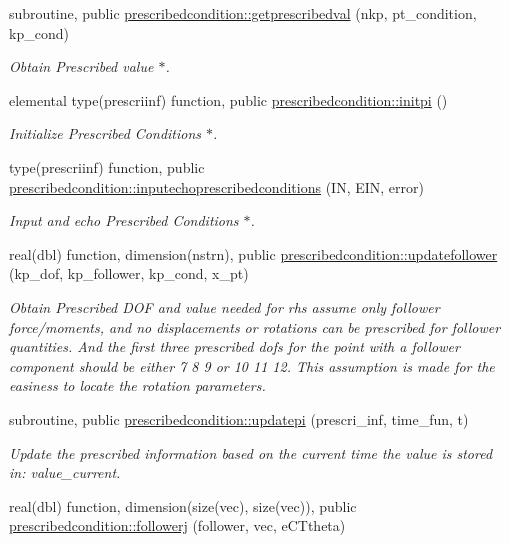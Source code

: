 \begin{DoxyCompactItemize}
subroutine, public \hyperlink{namespaceprescribedcondition_aca74e9a71af6abd13879e147076e89ef}{prescribedcondition\+::getprescribedval} (nkp, pt\+\_\+condition, kp\+\_\+cond)
\begin{DoxyCompactList}\small\item\em Obtain Prescribed value $\ast$. \end{DoxyCompactList}\item 
elemental type(prescriinf) function, public \hyperlink{namespaceprescribedcondition_ae3bccf07eaf4452047a11ce8dcb3e554}{prescribedcondition\+::initpi} ()
\begin{DoxyCompactList}\small\item\em Initialize Prescribed Conditions $\ast$. \end{DoxyCompactList}\item 
type(prescriinf) function, public \hyperlink{namespaceprescribedcondition_a66d378b405e124a0d9a7ad04e262109b}{prescribedcondition\+::inputechoprescribedconditions} (IN, E\+IN, error)
\begin{DoxyCompactList}\small\item\em Input and echo Prescribed Conditions $\ast$. \end{DoxyCompactList}\item 
real(dbl) function, dimension(nstrn), public \hyperlink{namespaceprescribedcondition_a58a4332d8bb0ceb882aa3229085dce34}{prescribedcondition\+::updatefollower} (kp\+\_\+dof, kp\+\_\+follower, kp\+\_\+cond, x\+\_\+pt)
\begin{DoxyCompactList}\small\item\em Obtain Prescribed D\+OF and value needed for rhs assume only follower force/moments, and no displacements or rotations can be prescribed for follower quantities. And the first three prescribed dofs for the point with a follower component should be either 7 8 9 or 10 11 12. This assumption is made for the easiness to locate the rotation parameters. \end{DoxyCompactList}\item 
subroutine, public \hyperlink{namespaceprescribedcondition_a270714d4f42553a8f966674392dedbfe}{prescribedcondition\+::updatepi} (prescri\+\_\+inf, time\+\_\+fun, t)
\begin{DoxyCompactList}\small\item\em Update the prescribed information based on the current time the value is stored in\+: value\+\_\+current. \end{DoxyCompactList}\item 
real(dbl) function, dimension(size(vec), size(vec)), public \hyperlink{namespaceprescribedcondition_a4c109cd4a8df6fedff99e15f448cf944}{prescribedcondition\+::followerj} (follower, vec, e\+C\+Ttheta)

\end{DoxyCompactItemize}
